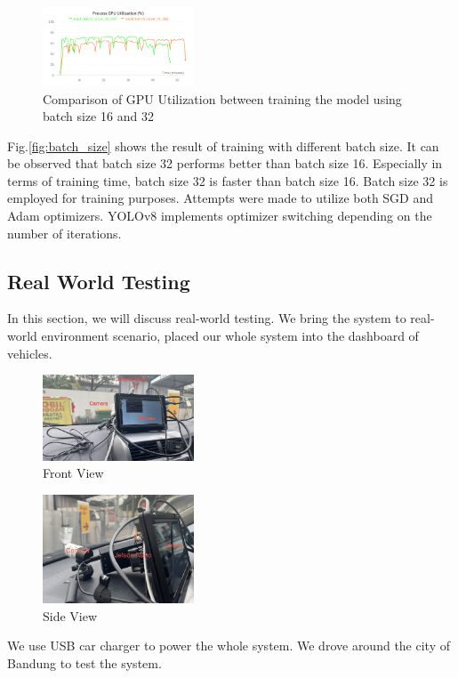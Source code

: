 \documentclass[conference]{IEEEtran}
\begin{document}
\begin{figure}[h!]
\centering
\includegraphics[width=0.4\textwidth,keepaspectratio]{gpu_utilization_comparison.png} 
\caption{Comparison of GPU Utilization between training the model using batch size 16 and 32}
\label{fig:gpu_utilization}
\end{figure}
Fig.\ref{fig:batch_size} shows the result of training with different batch size. It can be observed that batch size 32 performs better than batch size 16. Especially in terms of training time, batch size 32 is faster than batch size 16.
Batch size 32 is employed for training purposes. Attempts were made to utilize both SGD and Adam optimizers. YOLOv8 implements optimizer switching depending on the number of iterations.


\subsection{Real World Testing}
In this section, we will discuss real-world testing. We bring the system to real-world environment scenario, placed our whole system into the dashboard of vehicles.
\begin{figure}[h!]
    \centering
    \includegraphics[width=0.4\textwidth,keepaspectratio]{mounted_camera_front_view.jpg}
    \caption{Front View}
    \label{fig:front_view}
\end{figure}

\begin{figure}[h!]
\centering
\includegraphics[width=0.4\textwidth,keepaspectratio]{mounted_camera_side_view.jpg}
\caption{Side View}
\label{fig:side_view}
\end{figure}
We use USB car charger to power the whole system. We drove around the city of Bandung to test the system. 
\end{document}
